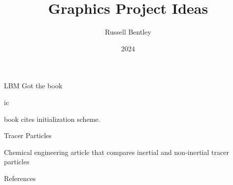 \documentclass{beamer}
\title{Graphics Project Ideas}
\author{Russell Bentley}
\institute{Stony Brook}
\date{2024}
\begin{document}
\frame{\titlepage}





\begin{frame}{LBM}
Got the book \cite{Kruger2018}

\end{frame}

\begin{frame}{ic}
\begin{outline}
  \1 \cite{Mei2006} book cites initialization scheme.
\end{outline}
\end{frame}

\begin{frame}{Tracer Particles}
  \begin{outline}
    \1 Chemical engineering article that compares inertial and non-inertial tracer particles \cite{Hofmann2022}

  \end{outline}
\end{frame}

\begin{frame}[allowframebreaks]{References}
    \tiny
    \printbibliography
\end{frame}
\end{document}
